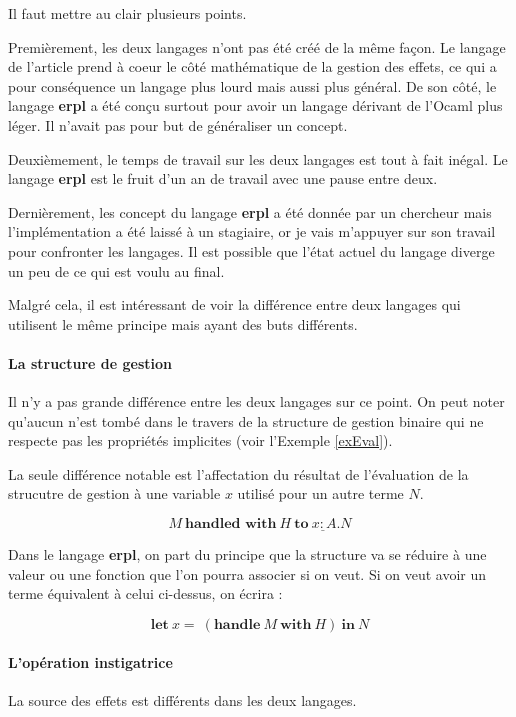 Il faut mettre au clair plusieurs points. 

Premièrement, les deux langages n'ont pas été créé de la même façon.
Le langage de l'article prend à coeur le côté mathématique de la gestion des effets, ce qui a pour conséquence
un langage plus lourd mais aussi plus général. De son côté, le langage \textbf{erpl} a été conçu surtout pour 
avoir un langage dérivant de l'Ocaml plus léger. Il n'avait pas pour but de généraliser un concept.

Deuxièmement, le temps de travail sur les deux langages est tout à fait inégal. Le langage \textbf{erpl} est le fruit d'un 
an de travail avec une pause entre deux.

Dernièrement, les concept du langage \textbf{erpl} a été donnée par un chercheur mais l'implémentation a été laissé
à un stagiaire, or je vais m'appuyer sur son travail pour confronter les langages. Il est possible que l'état actuel
du langage diverge un peu de ce qui est voulu au final.

Malgré cela, il est intéressant de voir la différence entre deux langages qui utilisent le même principe mais ayant des buts 
différents.

\paragraph{La structure de gestion} Il n'y a pas grande différence entre les deux langages sur ce point.
On peut noter qu'aucun n'est tombé dans le travers de la structure de gestion binaire qui ne respecte pas
les propriétés implicites (voir l'Exemple \ref{exEval}). 

La seule différence notable est l'affectation du résultat de l'évaluation de la strucutre de  gestion
à une variable $x$ utilisé pour un autre terme $N$.

\[M~\textbf{handled~with}~H~\underline{\textbf{to}~x:A.N}\]

Dans le langage \textbf{erpl}, on part du principe que la structure va se réduire à une valeur ou une fonction que l'on
pourra associer si on veut. Si on veut avoir un terme équivalent à celui ci-dessus, on écrira :

\[ \textbf{let}~x =~(\textbf{handle}~M~\textbf{with}~H)~\textbf{in}~N \]

\paragraph{L'opération instigatrice} La source des effets est différents dans les deux langages.


